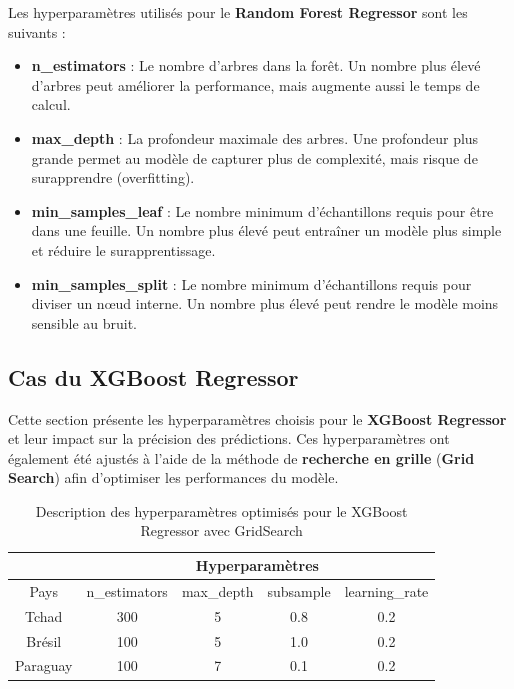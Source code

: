 Les hyperparamètres utilisés pour le \textbf{Random Forest Regressor} sont les suivants :
\begin{itemize}
	\item \textbf{n\_estimators} : Le nombre d'arbres dans la forêt. Un nombre plus élevé d'arbres peut améliorer la performance, mais augmente aussi le temps de calcul.
	\item \textbf{max\_depth} : La profondeur maximale des arbres. Une profondeur plus grande permet au modèle de capturer plus de complexité, mais risque de surapprendre (overfitting).
	\item \textbf{min\_samples\_leaf} : Le nombre minimum d'échantillons requis pour être dans une feuille. Un nombre plus élevé peut entraîner un modèle plus simple et réduire le surapprentissage.
	\item \textbf{min\_samples\_split} : Le nombre minimum d'échantillons requis pour diviser un nœud interne. Un nombre plus élevé peut rendre le modèle moins sensible au bruit.
\end{itemize}

\subsection{Cas du XGBoost Regressor}
Cette section présente les hyperparamètres choisis pour le \textbf{XGBoost Regressor} et leur impact sur la précision des prédictions. Ces hyperparamètres ont également été ajustés à l’aide de la méthode de \textbf{recherche en grille} (\textbf{Grid Search}) afin d’optimiser les performances du modèle.

\begin{table}[!hbt]
	\centering
	\caption{Description des hyperparamètres optimisés pour le XGBoost Regressor avec GridSearch}
	\begin{tabular}{|c|c|c|c|c|}
		\hline
		& \multicolumn{4}{c|}{Hyperparamètres} \\
		\hline
		Pays & \textsf{n\_estimators} & \textsf{max\_depth} & \textsf{subsample} & \textsf{learning\_rate} \\
		\hline
		Tchad & 300 & 5 & 0.8 & 0.2 \\
		\hline
		Brésil & 100 & 5 & 1.0 & 0.2 \\
		\hline
		Paraguay & 100 & 7 & 0.1 & 0.2 \\
		\hline
	\end{tabular}
\end{table}


